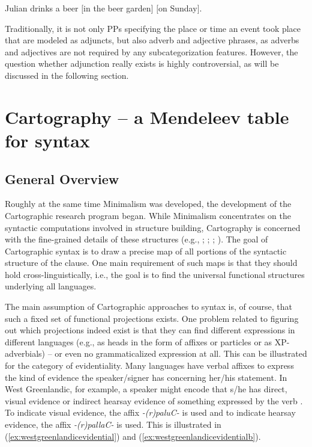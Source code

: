 \begin{exe}
\ex\label{simpleargumentsoftheverbbb} Julian drinks a beer $[$in the beer garden$]$ $[$on Sunday$]$.
\end{exe}

\noindent Traditionally, it is not only PPs specifying the place or time an event took place that are modeled as adjuncts, but also adverb and adjective phrases, as adverbs and adjectives are not required by any subcategorization features.  However, the question whether adjunction really exists is highly controversial, as will be discussed in the following section.
\label{generaladjunctionb}


\section{Cartography -- a Mendeleev table for syntax}\label{cartographicenterprise}\label{theoryintrob}
\subsection{General Overview}
Roughly at the same time Minimalism was developed, the development of the Cartographic research program began. While Minimalism concentrates on the syntactic computations involved in structure building, Cartography is concerned with the fine-grained details of these structures (e.g., \citealt{cinque1999adverbs}; \citealt{rizzi2004cartography}; \citealt{belletti2008structures}; \citealt{cinque2008cartography}). The goal of Cartographic syntax is to draw a precise map of all portions of the syntactic structure of the clause. One main requirement of such maps is that they should hold cross-linguistically, i.e., the goal is to find the universal functional structures underlying all languages. 

The main assumption of Cartographic approaches to syntax is, of course, that such a fixed set of functional projections exists. One problem related to figuring out which projections indeed exist is that they can find different expressions in different languages (e.g., as heads in the form of affixes or particles or as XP-adverbials) -- or even no grammaticalized expression at all. This can be illustrated for the category of evidentiality. Many languages have verbal affixes to express the kind of evidence the speaker/signer has concerning her/his statement. In West Greenlandic, for example, a speaker might encode that s/he has direct, visual evidence or indirect hearsay evidence of something expressed by the verb \citep{fortescue2003evidentiality}. To indicate visual evidence, the affix \textit{-(r)paluC-} is used and to indicate hearsay evidence, the affix \textit{-(r)pallaC-} is used. This is illustrated in (\ref{ex:westgreenlandicevidential}) and (\ref{ex:westgreenlandicevidentialb}).

